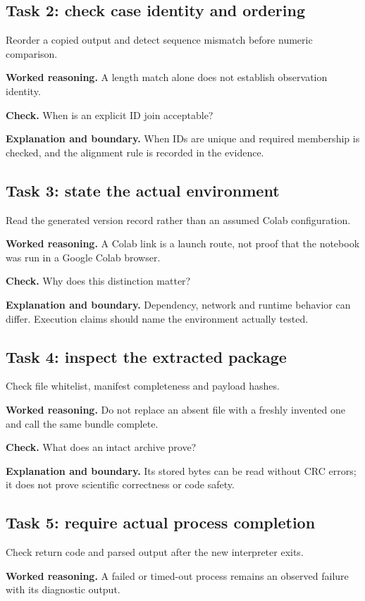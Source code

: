 \subsection{Task 2: check case identity and ordering}
Reorder a copied output and detect sequence mismatch before numeric comparison.

\textbf{Worked reasoning.} A length match alone does not establish observation identity.

\textbf{Check.} When is an explicit ID join acceptable?

\textbf{Explanation and boundary.} When IDs are unique and required membership is checked, and the alignment rule is recorded in the evidence.

\subsection{Task 3: state the actual environment}
Read the generated version record rather than an assumed Colab configuration.

\textbf{Worked reasoning.} A Colab link is a launch route, not proof that the notebook was run in a Google Colab browser.

\textbf{Check.} Why does this distinction matter?

\textbf{Explanation and boundary.} Dependency, network and runtime behavior can differ. Execution claims should name the environment actually tested.

\subsection{Task 4: inspect the extracted package}
Check file whitelist, manifest completeness and payload hashes.

\textbf{Worked reasoning.} Do not replace an absent file with a freshly invented one and call the same bundle complete.

\textbf{Check.} What does an intact archive prove?

\textbf{Explanation and boundary.} Its stored bytes can be read without CRC errors; it does not prove scientific correctness or code safety.

\subsection{Task 5: require actual process completion}
Check return code and parsed output after the new interpreter exits.

\textbf{Worked reasoning.} A failed or timed-out process remains an observed failure with its diagnostic output.

